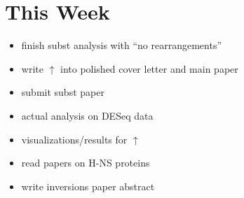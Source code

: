 \documentclass[12pt]{article}
\newcommand{\smel}{\textit{S.\,meliloti}\xspace}
\newcommand{\p}{progressiveMauve\xspace}
\newcommand{\strep}{\textit{Streptomyces}\xspace}
\newcommand{\ecol}{\textit{E.\,coli}\xspace}
\newcommand{\ecoli}{\textit{Escherichia coli}\xspace}
\newcommand{\pa}{pSymA\xspace}
\newcommand{\dn}{\textit{dN}\xspace}
\begin{document}



\section*{This Week}
%
\begin{itemize}
	\item finish subst analysis with ``no rearrangements''
	\item write $\uparrow$ into polished cover letter and main paper
	\item submit subst paper
	\item actual analysis on DESeq data
	\item visualizations/results for $\uparrow$
	\item read papers on H-NS proteins
\item write inversions paper abstract

\end{itemize}
\end{document}
